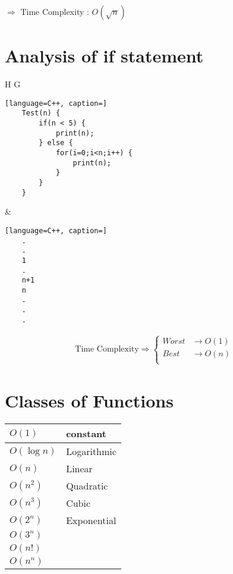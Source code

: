 \documentclass[12pt]{article}
\begin{document}
$\Rightarrow$ Time Complexity : $O(\sqrt{n})$







\section{Analysis of if statement}


\begin{center}
  \bgroup
  \def\arraystretch{1.5}%
  \begin{tabular}{ H  G  }
	\begin{lstlisting}[language=C++, caption=]
	Test(n) {
		if(n < 5) {
			print(n);
		} else {
			for(i=0;i<n;i++) {
				print(n);
			}
		}
	}
	\end{lstlisting}
	&
	\begin{lstlisting}[language=C++, caption=]
	.
	.
	1
	.
	n+1
	n
	.
	.
	.
	\end{lstlisting}
  \end{tabular}
  \egroup
\end{center}


\begin{align*}
\text{Time Complexity} \Rightarrow
\begin{cases}
Worst &\to O(1) \\
Best &\to O(n) \\
\end{cases}
\end{align*}



\section{Classes of Functions}




\begin{center}
  \bgroup
  \def\arraystretch{1.5}%
  \begin{tabular}{ l | l  }
	$O(1)$
	&
	constant
	\\ \hline
	$O(\log{n})$
	&
	Logarithmic
	\\ \hline
	$O(n)$
	&
	Linear
	\\ \hline
	$O(n^{2})$
	&
	Quadratic
	\\ \hline
	$O(n^{3})$
	&
	Cubic
	\\ \hline
	$O(2^{n})$
	&
	Exponential
	\\ \hline
	$O(3^{n})$
	&
	
	\\ \hline
	$O(n!)$
	&
	
	\\ \hline
	$O(n^{n})$
	&
	
	\\ 
  \end{tabular}
  \egroup
\end{center}
\end{document}
